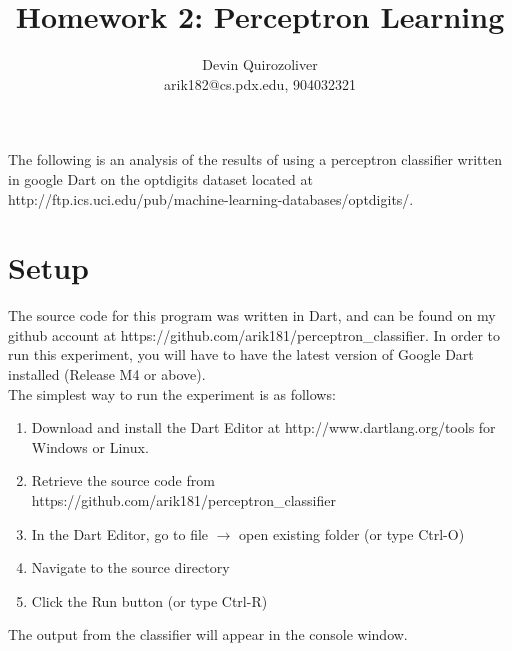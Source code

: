 \documentclass[titlepage,11pt]{article}
\title{Homework 2: Perceptron Learning}
\author{Devin Quirozoliver\\arik182@cs.pdx.edu, 904032321}
\begin{document}
\maketitle

\section*{} {
    \hspace{2pt} The following is an analysis of the results of using a perceptron classifier written in google Dart on the optdigits dataset located at http://ftp.ics.uci.edu/pub/machine-learning-databases/optdigits/. 
}

\section[1]{Setup} {
    \hspace{2pt} The source code for this program was written in Dart, and can be found on my github account at https://github.com/arik181/perceptron\_classifier. In order to run this experiment, you will have to have the latest version of Google Dart installed (Release M4 or above).\\
    The simplest way to run the experiment is as follows:
    \begin{enumerate} 
        \item Download and install the Dart Editor at http://www.dartlang.org/tools for Windows or Linux.
        \item Retrieve the source code from https://github.com/arik181/perceptron\_classifier
        \item In the Dart Editor, go to file $\rightarrow$ open existing folder (or type Ctrl-O)
        \item Navigate to the source directory
        \item Click the Run button (or type Ctrl-R)
    \end{enumerate} 
    The output from the classifier will appear in the console window.
}
\end{document}
